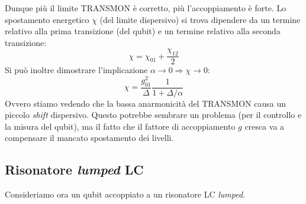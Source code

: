Dunque più il limite TRANSMON è corretto, più l'accoppiamento è forte.
Lo spostamento energetico $\chi$ (del limite dispersivo) si trova dipendere da un termine relativo alla prima transizione (del qubit) e un termine relativo alla seconda transizione:
\begin{equation*}
    \chi = \chi_{01} + \frac{\chi_{12}}{2}
\end{equation*}
Si può inoltre dimostrare l'implicazione $\alpha \rightarrow 0 \Longrightarrow \chi \rightarrow 0$:
\begin{equation*}
    \chi = \frac{g^2_{01}}{\Delta}\frac{1}{1 + \Delta /\alpha}
\end{equation*}
Ovvero stiamo vedendo che la bassa anarmonicità del TRANSMON causa un piccolo \textit{shift} dispersivo. Questo potrebbe sembrare un problema (per il controllo e la misura del qubit), ma il fatto che il fattore di accoppiamento $g$ cresca va a compensare il mancato spostamento dei livelli.

\subsection{Risonatore \textit{lumped} LC}

Consideriamo ora un qubit accoppiato a un risonatore LC \textit{lumped}.

